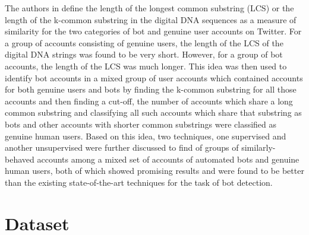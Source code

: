 \documentclass{llncs}
\begin{document}
The authors in \cite{7876716} define the length of the longest common substring (LCS) or the length of the k-common substring in the digital DNA sequences as a measure of similarity for the two categories of bot and genuine user accounts on Twitter. For a group of accounts consisting of genuine users, the length of the LCS of the digital DNA strings was found to be very short. However, for a group of bot accounts, the length of the LCS was much longer. This idea was then used to identify bot accounts in a mixed group of user accounts which contained accounts for both genuine users and bots by finding the k-common substring for all those accounts and then finding a cut-off, the number of accounts which share a long common substring and classifying all such accounts which share that substring as bots and other accounts with shorter common substrings were classified as genuine human users. Based on this idea, two techniques, one supervised and another unsupervised were further discussed to find of groups of similarly-behaved accounts among a mixed set of accounts of automated bots and genuine human users, both of which showed promising results and were found to be better than the existing state-of-the-art techniques for the task of bot detection.


\section{Dataset}
\end{document}
